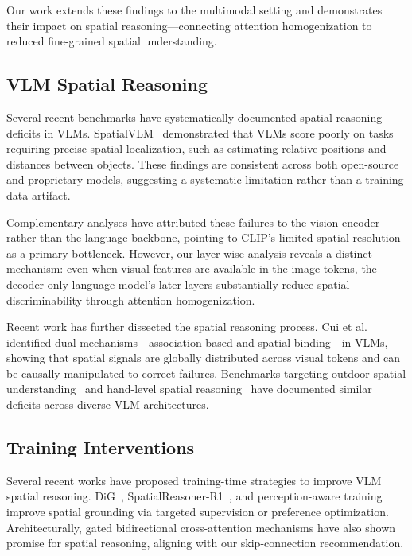 \documentclass[10pt,twocolumn,letterpaper]{article}
\begin{document}
Our work extends these findings to the multimodal setting and demonstrates their impact on spatial reasoning---connecting attention homogenization to reduced fine-grained spatial understanding.

\subsection{VLM Spatial Reasoning}

Several recent benchmarks have systematically documented spatial reasoning deficits in VLMs. SpatialVLM~\cite{SpatialVLM} demonstrated that VLMs score poorly on tasks requiring precise spatial localization, such as estimating relative positions and distances between objects. These findings are consistent across both open-source and proprietary models, suggesting a systematic limitation rather than a training data artifact.

Complementary analyses have attributed these failures to the vision encoder rather than the language backbone, pointing to CLIP's limited spatial resolution as a primary bottleneck. However, our layer-wise analysis reveals a distinct mechanism: even when visual features are available in the image tokens, the decoder-only language model's later layers substantially reduce spatial discriminability through attention homogenization.

Recent work has further dissected the spatial reasoning process. Cui et al.~\cite{Cui2025dual} identified dual mechanisms---association-based and spatial-binding---in VLMs, showing that spatial signals are globally distributed across visual tokens and can be causally manipulated to correct failures. Benchmarks targeting outdoor spatial understanding~\cite{Guo2024surds} and hand-level spatial reasoning~\cite{Sayem2026handvqa} have documented similar deficits across diverse VLM architectures.

\subsection{Training Interventions}

Several recent works have proposed training-time strategies to improve VLM spatial reasoning. DiG~\cite{Tao2025dig}, SpatialReasoner-R1~\cite{Shen2025fine}, and perception-aware training~\cite{Cheng2026perception} improve spatial grounding via targeted supervision or preference optimization. Architecturally, gated bidirectional cross-attention mechanisms have also shown promise for spatial reasoning, aligning with our skip-connection recommendation.
\end{document}
